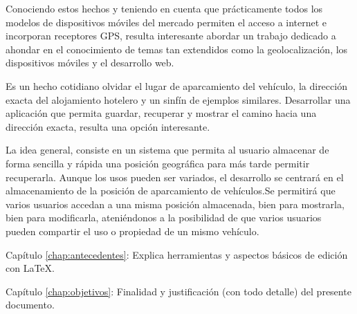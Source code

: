 
Conociendo estos hechos y teniendo en cuenta que prácticamente todos los modelos de dispositivos móviles del mercado permiten el acceso a internet e incorporan receptores \ac{GPS}, resulta interesante abordar un trabajo dedicado a ahondar en el conocimiento de temas tan extendidos como la geolocalización, los dispositivos móviles y el desarrollo web.

Es un hecho cotidiano olvidar el lugar de aparcamiento del vehículo, la dirección exacta del alojamiento hotelero y un sinfín de ejemplos similares. Desarrollar una aplicación que permita guardar, recuperar y mostrar el camino hacia una dirección exacta, resulta una opción interesante.

La idea general, consiste en un sistema que permita al usuario almacenar de forma sencilla y rápida una posición geográfica para más tarde permitir recuperarla. Aunque los usos pueden ser variados, el desarrollo se centrará en el almacenamiento de la posición de aparcamiento de vehículos.Se permitirá que varios usuarios accedan a una misma posición almacenada, bien para mostrarla, bien para modificarla, ateniéndonos a la posibilidad de que varios usuarios pueden compartir el uso o propiedad de un mismo vehículo.

%
%
%
%
%

\begin{definitionlist}
\item[Capítulo \ref{chap:antecedentes}: \nameref{chap:antecedentes}] Explica herramientas
  y aspectos básicos de edición con \LaTeX.
\item[Capítulo \ref{chap:objetivos}: \nameref{chap:objetivos}] Finalidad y justificación
  (con todo detalle) del presente documento.
\end{definitionlist}



